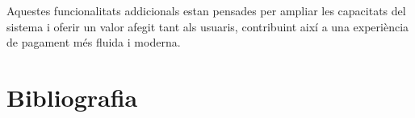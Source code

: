 \documentclass[a4paper,12pt,twoside]{ThesisStyle}
\begin{document}
Aquestes funcionalitats addicionals estan pensades per ampliar les capacitats del sistema i oferir un valor afegit tant als usuaris, contribuint així a una experiència de pagament més fluida i moderna.



\chapter{Bibliografia}
\label{chp:Bibliografia}

















\end{document}
